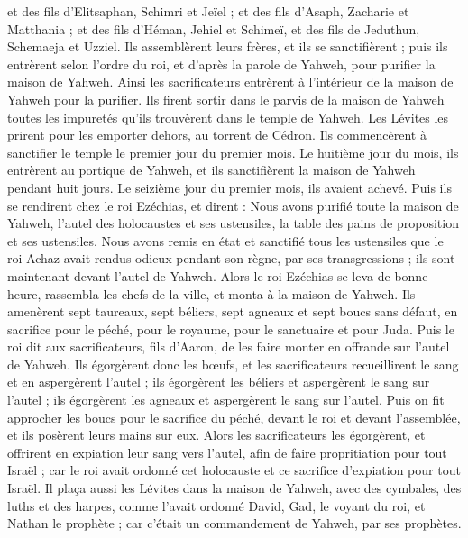 \begin{multicols}{2}
et des fils d'Elitsaphan, Schimri et Jeïel ; et des fils d'Asaph, Zacharie et Matthania ;
et des fils d'Héman, Jehiel et Schimeï, et des fils de Jeduthun, Schemaeja et Uzziel.
Ils assemblèrent leurs frères, et ils se sanctifièrent ; puis ils entrèrent selon l'ordre du roi, et d'après la parole de Yahweh, pour purifier la maison de Yahweh.
Ainsi les sacrificateurs entrèrent à l'intérieur de la maison de Yahweh pour la purifier. Ils firent sortir dans le parvis de la maison de Yahweh toutes les impuretés qu'ils trouvèrent dans le temple de Yahweh. Les Lévites les prirent pour les emporter dehors, au torrent de Cédron.
Ils commencèrent à sanctifier le temple le premier jour du premier mois. Le huitième jour du mois, ils entrèrent au portique de Yahweh, et ils sanctifièrent la maison de Yahweh pendant huit jours. Le seizième jour du premier mois, ils avaient achevé.
Puis ils se rendirent chez le roi Ezéchias, et dirent : Nous avons purifié toute la maison de Yahweh, l'autel des holocaustes et ses ustensiles, la table des pains de proposition et ses ustensiles.
Nous avons remis en état et sanctifié tous les ustensiles que le roi Achaz avait rendus odieux pendant son règne, par ses transgressions ; ils sont maintenant devant l'autel de Yahweh.
Alors le roi Ezéchias se leva de bonne heure, rassembla les chefs de la ville, et monta à la maison de Yahweh.
Ils amenèrent sept taureaux, sept béliers, sept agneaux et sept boucs sans défaut, en sacrifice pour le péché, pour le royaume, pour le sanctuaire et pour Juda. Puis le roi dit aux sacrificateurs, fils d'Aaron, de les faire monter en offrande sur l'autel de Yahweh.
Ils égorgèrent donc les bœufs, et les sacrificateurs recueillirent le sang et en aspergèrent l'autel ; ils égorgèrent les béliers et aspergèrent le sang sur l'autel ; ils égorgèrent les agneaux et aspergèrent le sang sur l'autel.
Puis on fit approcher les boucs pour le sacrifice du péché, devant le roi et devant l'assemblée, et ils posèrent leurs mains sur eux.
Alors les sacrificateurs les égorgèrent, et offrirent en expiation leur sang vers l'autel, afin de faire propritiation pour tout Israël ; car le roi avait ordonné cet holocauste et ce sacrifice d'expiation pour tout Israël.
Il plaça aussi les Lévites dans la maison de Yahweh, avec des cymbales, des luths et des harpes, comme l'avait ordonné David, Gad, le voyant du roi, et Nathan le prophète ; car c'était un commandement de Yahweh, par ses prophètes.

\end{multicols}
